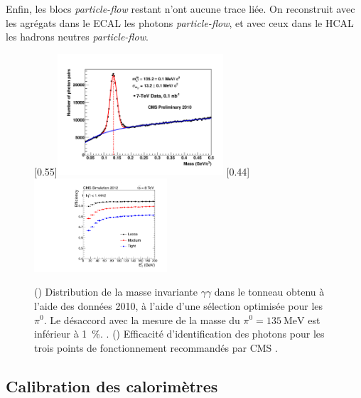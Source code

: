 Enfin, les blocs \emph{particle-flow} restant n'ont aucune trace liée. On reconstruit avec les agrégats dans le ECAL les photons \emph{particle-flow}, et avec ceux dans le HCAL les hadrons neutres \emph{particle-flow}.

\begin{figure}[tbp]
    \centering
    \subcaptionbox{\label{fig:mgg}}[0.55\textwidth]{\includegraphics[width=0.55\textwidth]{chapitre3/figs/pf_photons.pdf}} \hfill
    \subcaptionbox{\label{fig:gamma_eff}}[0.44\textwidth]{\includegraphics[width=0.44\textwidth]{chapitre3/figs/photon_eff.pdf}}
    \caption{() Distribution de la masse invariante $\gamma\gamma$ dans le tonneau obtenu à l'aide des données 2010, à l'aide d'une sélection optimisée pour les $\pi^0$. Le désaccord avec la mesure de la masse du $\pi^0 = \SI{135}{\MeV}$ est inférieur à \SI{1}{\%}. \citep{cms_pf_jets}. () Efficacité d'identification des photons pour les trois points de fonctionnement recommandés par CMS \citep{cms_photon_perf}.}
    \label{fig:pf_photons}
\end{figure}

\subsection{Calibration des calorimètres}


